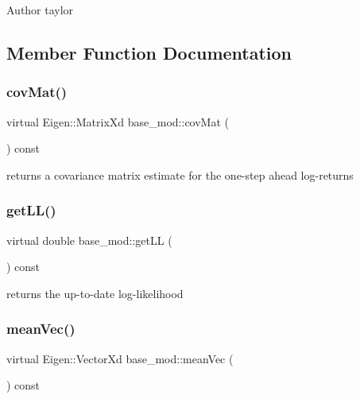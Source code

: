 \begin{DoxyAuthor}{Author}
taylor 
\end{DoxyAuthor}


\subsection{Member Function Documentation}
\mbox{\label{classbase__mod_a7cad99311e5ea17679f3eae2b5fd4319}} 
\subsubsection{\texorpdfstring{cov\+Mat()}{covMat()}}
{\footnotesize\ttfamily virtual Eigen\+::\+Matrix\+Xd base\+\_\+mod\+::cov\+Mat (\begin{DoxyParamCaption}{ }\end{DoxyParamCaption}) const\hspace{0.3cm}{\ttfamily [pure virtual]}}



returns a covariance matrix estimate for the one-\/step ahead log-\/returns 

\mbox{\label{classbase__mod_a7d580c83175fab5d1f553afabca9da50}} 
\subsubsection{\texorpdfstring{get\+L\+L()}{getLL()}}
{\footnotesize\ttfamily virtual double base\+\_\+mod\+::get\+LL (\begin{DoxyParamCaption}{ }\end{DoxyParamCaption}) const\hspace{0.3cm}{\ttfamily [pure virtual]}}



returns the up-\/to-\/date log-\/likelihood 

\mbox{\label{classbase__mod_a4191d277945f98b4a6eaa663cb70d678}} 
\subsubsection{\texorpdfstring{mean\+Vec()}{meanVec()}}
{\footnotesize\ttfamily virtual Eigen\+::\+Vector\+Xd base\+\_\+mod\+::mean\+Vec (\begin{DoxyParamCaption}{ }\end{DoxyParamCaption}) const\hspace{0.3cm}{\ttfamily [pure virtual]}}



